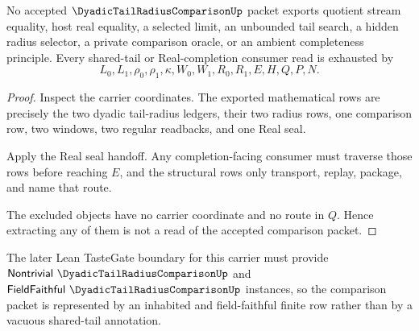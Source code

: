 \begin{theorem}
\label{thm:dyadic-tail-radius-comparison-nonescape}
No accepted $\DyadicTailRadiusComparisonUp$ packet exports quotient stream equality, host real equality, a selected limit, an unbounded tail search, a hidden radius selector, a private comparison oracle, or an ambient completeness principle. Every shared-tail or Real-completion consumer read is exhausted by
$$
L_0,L_1,\rho_0,\rho_1,\kappa,W_0,W_1,R_0,R_1,E,H,Q,P,N.
$$
\end{theorem}
\begin{proof}
Inspect the carrier coordinates. The exported mathematical rows are precisely the two dyadic tail-radius ledgers, their two radius rows, one comparison row, two windows, two regular readbacks, and one Real seal.

Apply the Real seal handoff. Any completion-facing consumer must traverse those rows before reaching $E$, and the structural rows only transport, replay, package, and name that route.

The excluded objects have no carrier coordinate and no route in $Q$. Hence extracting any of them is not a read of the accepted comparison packet.
\end{proof}



The later Lean TasteGate boundary for this carrier must provide $\mathsf{Nontrivial}\ \DyadicTailRadiusComparisonUp$ and $\mathsf{FieldFaithful}\ \DyadicTailRadiusComparisonUp$ instances, so the comparison packet is represented by an inhabited and field-faithful finite row rather than by a vacuous shared-tail annotation.


